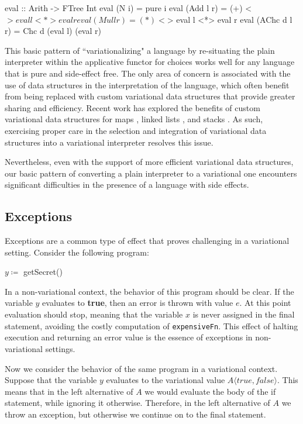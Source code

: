\documentclass[letterpaper,10pt,onecolumn]{article}
\newcommand{\prog}[1]{{\small\texttt{#1}}}
\newcommand{\tagtree}[3]{#1 \langle #2, #3 \rangle}
\begin{document}
\begin{program}
eval :: Arith -> FTree Int
eval (N i) = pure i
eval (Add l r) = (+) <$> eval l <*> eval r
eval (Mul l r) = (*) <$> eval l <*> eval r
eval (AChc d l r) = Chc d (eval l) (eval r)
\end{program}

This basic pattern of ``variationalizing" a language by re-situating the
plain interpreter within the applicative functor for choices works well for any language that is pure
and side-effect free. The only area of concern is associated with the use of data structures in the
interpretation of the language, which often benefit from being replaced with custom variational data structures that
provide greater sharing and efficiency. Recent work has explored the benefits of custom variational
data structures for maps \cite{erictodo}, linked lists \cite{karltodo}, and stacks \cite{mengtodo}.
As such, exercising proper care in the selection and integration of variational data structures
into a variational interpreter resolves this issue.

Nevertheless, even with the support of more efficient
variational data structures, our basic pattern of converting a plain interpreter to a variational one
encounters significant difficulties in the presence of a language with side effects.

\subsection{Exceptions}

Exceptions are a common type of effect that proves challenging in a variational setting.
Consider the following program:

\begin{algorithmic}
\STATE $y \coloneqq$ getSecret()
\ENDIF
{}
\end{algorithmic}

In a non-variational context, the behavior of this program should be clear.
If the variable $y$ evaluates to \textbf{true}, then an error is thrown with value
$e$. At this point evaluation should stop, meaning that the variable $x$ is never
assigned in the final statement, avoiding the costly computation of \prog{expensiveFn}. This effect of halting execution and
returning an error value is the essence of exceptions in non-variational settings.

Now we consider the behavior of the same program in a variational context.
Suppose that the variable $y$ evaluates to the variational value
$\tagtree{A}{true}{false}$. This means that in the left alternative of $A$ we
would evaluate the body of the if statement, while ignoring it otherwise. Therefore,
in the left alternative of $A$ we throw an exception, but otherwise we continue on to the
final statement.
\end{document}
